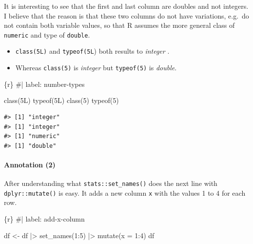 \documentclass[
  letterpaper,
  DIV=11,
  numbers=noendperiod]{scrreprt}
\let\oldparagraph\paragraph
\renewcommand{\paragraph}[1]{\oldparagraph{#1}\mbox{}}
\newenvironment{Shaded}{\begin{snugshade}}{\end{snugshade}}
\newcommand{\AttributeTok}[1]{\textcolor[rgb]{0.40,0.45,0.13}{#1}}
\newcommand{\CommentTok}[1]{\textcolor[rgb]{0.37,0.37,0.37}{#1}}
\newcommand{\DecValTok}[1]{\textcolor[rgb]{0.68,0.00,0.00}{#1}}
\newcommand{\FunctionTok}[1]{\textcolor[rgb]{0.28,0.35,0.67}{#1}}
\newcommand{\InformationTok}[1]{\textcolor[rgb]{0.37,0.37,0.37}{#1}}
\newcommand{\NormalTok}[1]{\textcolor[rgb]{0.00,0.23,0.31}{#1}}
\newcommand{\OtherTok}[1]{\textcolor[rgb]{0.00,0.23,0.31}{#1}}
\newcommand{\SpecialCharTok}[1]{\textcolor[rgb]{0.37,0.37,0.37}{#1}}
\providecommand{\tightlist}{%
  \setlength{\itemsep}{0pt}\setlength{\parskip}{0pt}}\usepackage{longtable,booktabs,array}
\begin{document}
It is interesting to see that the first and last column are doubles and
not integers. I believe that the reason is that these two columns do not
have variations, e.g.~do not contain both variable values, so that R
assumes the more general class of \texttt{numeric} and type of
\texttt{double}.

\begin{itemize}
\tightlist
\item
  \texttt{class(5L)} and \texttt{typeof(5L}) both results to
  \emph{integer} .
\item
  Whereas \texttt{class(5)} is \emph{integer} but \texttt{typeof(5)} is
  \emph{double}.
\end{itemize}

\begin{Shaded}
\begin{Highlighting}[]
\InformationTok{\textasciigrave{}\textasciigrave{}\textasciigrave{}\{r\}}
\CommentTok{\#| label: number{-}types}

\FunctionTok{class}\NormalTok{(5L)}
\FunctionTok{typeof}\NormalTok{(5L)}
\FunctionTok{class}\NormalTok{(}\DecValTok{5}\NormalTok{)}
\FunctionTok{typeof}\NormalTok{(}\DecValTok{5}\NormalTok{)}
\InformationTok{\textasciigrave{}\textasciigrave{}\textasciigrave{}}
\end{Highlighting}
\end{Shaded}

\begin{verbatim}
#> [1] "integer"
#> [1] "integer"
#> [1] "numeric"
#> [1] "double"
\end{verbatim}

\hypertarget{annotation-2}{%
\paragraph{Annotation (2)}\label{annotation-2}}

After understanding what \texttt{stats::set\_names()} does the next line
with \texttt{dplyr::mutate()} is easy. It adds a new column \texttt{x}
with the values 1 to 4 for each row.

\begin{Shaded}
\begin{Highlighting}[]
\InformationTok{\textasciigrave{}\textasciigrave{}\textasciigrave{}\{r\}}
\CommentTok{\#| label: add{-}x{-}column}

\NormalTok{df }\OtherTok{\textless{}{-}}\NormalTok{ df }\SpecialCharTok{|\textgreater{}} 
    \FunctionTok{set\_names}\NormalTok{(}\DecValTok{1}\SpecialCharTok{:}\DecValTok{5}\NormalTok{) }\SpecialCharTok{|\textgreater{}} 
    \FunctionTok{mutate}\NormalTok{(}\AttributeTok{x =} \DecValTok{1}\SpecialCharTok{:}\DecValTok{4}\NormalTok{)}
\NormalTok{df}
\InformationTok{\textasciigrave{}\textasciigrave{}\textasciigrave{}}
\end{Highlighting}
\end{Shaded}
\end{document}
